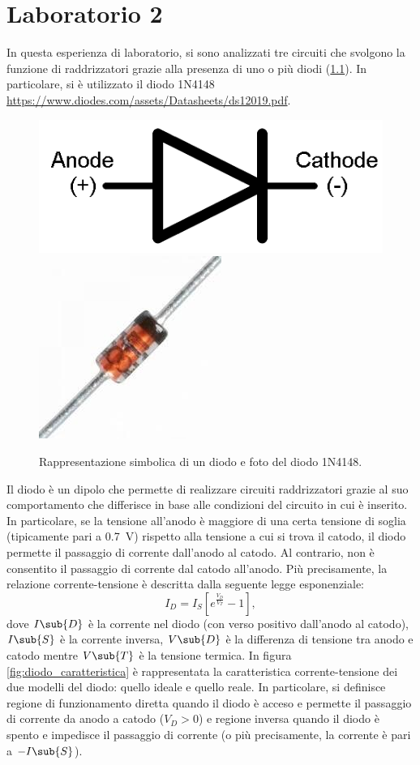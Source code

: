 \chapter{Laboratorio 2}
In questa esperienza di laboratorio, si sono analizzati tre circuiti che svolgono la funzione di raddrizzatori grazie alla presenza di uno o più diodi (\Fig\ref{fig:diodo}). In particolare, si è utilizzato il diodo 1N4148 \url{https://www.diodes.com/assets/Datasheets/ds12019.pdf}.
\begin{figure}[h]
	\centering
	\includegraphics[width=0.25\linewidth]{./ImageFiles/Laboratorio 2/diodo_1}
	\includegraphics[width=0.15\linewidth]{./ImageFiles/Laboratorio 2/diodo_4}
	\caption{Rappresentazione simbolica di un diodo e foto del diodo 1N4148.}
	\label{fig:diodo}
\end{figure}
Il diodo è un dipolo che permette di realizzare circuiti raddrizzatori grazie al suo comportamento che differisce in base alle condizioni del circuito in cui è inserito. In particolare, se la tensione all'anodo è maggiore di una certa tensione di soglia (tipicamente pari a \SI{0.7}{\volt}) rispetto alla tensione a cui si trova il catodo, il diodo permette il passaggio di corrente dall'anodo al catodo. Al contrario, non è consentito il passaggio di corrente dal catodo all'anodo. Più precisamente, la relazione corrente-tensione è descritta dalla seguente legge esponenziale:
\begin{equation}
	I_D=I_S[e^{\frac{V_D}{V_T}}-1],
\end{equation}
dove $I\sub{D}$ è la corrente nel diodo (con verso positivo dall'anodo al catodo), $I\sub{S}$ è la corrente inversa, $V\sub{D}$ è la differenza di tensione tra anodo e catodo mentre $V\sub{T}$ è la tensione termica. In figura \ref{fig:diodo_caratteristica} è rappresentata la caratteristica corrente-tensione dei due modelli del diodo: quello ideale e quello reale. In particolare, si definisce regione di funzionamento diretta quando il diodo è acceso e permette il passaggio di corrente da anodo a catodo ($V_{D}>0$) e regione inversa quando il diodo è spento e impedisce il passaggio di corrente (o più precisamente, la corrente è pari a $-I\sub{S}$).
